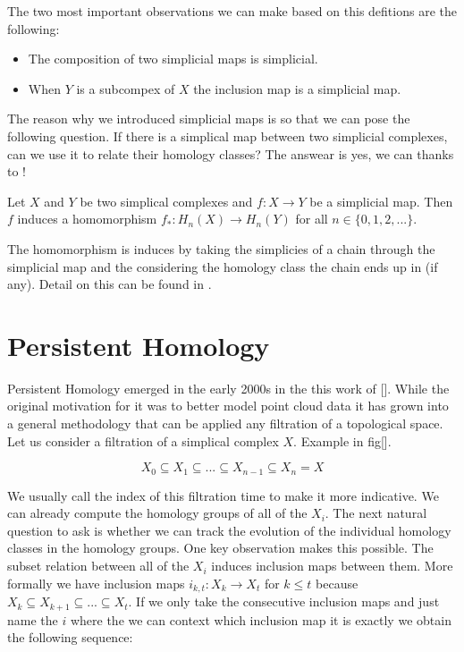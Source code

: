 The two most important observations we can make based on this defitions are the following:

\begin{itemize}
    \item The composition of two simplicial maps is simplicial.
    \item When $Y$ is a subcompex of $X$ the inclusion map is a simplicial map.
\end{itemize}


The reason why we introduced simplicial maps is so that we can pose the following question. If there is a simplical map between two simplicial complexes, can we use it to relate their homology classes? The answear is yes, we can thanks to \cite{combinatorial-algebraic-topology}!



\begin{defn} Let $X$ and $Y$ be two simplical complexes and $f: X \to Y$ be a simplicial map. Then $f$ induces a homomorphism $f_*: H_n(X) \to H_n(Y)$ for all $n \in \{0, 1, 2, ...\}$. \end{defn}

    The homomorphism is induces by taking the simplicies of a chain through the simplicial map and the considering the homology class the chain ends up in (if any). Detail on this can be found in \cite{combinatorial-algebraic-topology}.


\section{Persistent Homology}


Persistent Homology emerged in the early 2000s in the this work of []. While the original motivation for it was to better model point cloud data it has grown into a general methodology that can be applied any filtration of a topological space. Let us consider a filtration of a simplical complex $X$. Example in fig[].

$$ X_0 \subseteq X_1 \subseteq ... \subseteq X_{n-1} \subseteq X_n = X$$

We usually call the index of this filtration time to make it more indicative. We can already compute the homology groups of all of the $X_i$. The next natural question to ask is whether we can track the evolution of the individual homology classes in the homology groups. One key observation makes this possible. The subset relation between all of the $X_i$ induces inclusion maps between them. More formally we have inclusion maps $i_{k, t}: X_k \to X_t$ for $k \le t$ because $X_k \subseteq X_{k+1} \subseteq ... \subseteq X_t$. If we only take the consecutive inclusion maps and just name the $i$ where the we can context which inclusion map it is exactly we obtain the following sequence:


